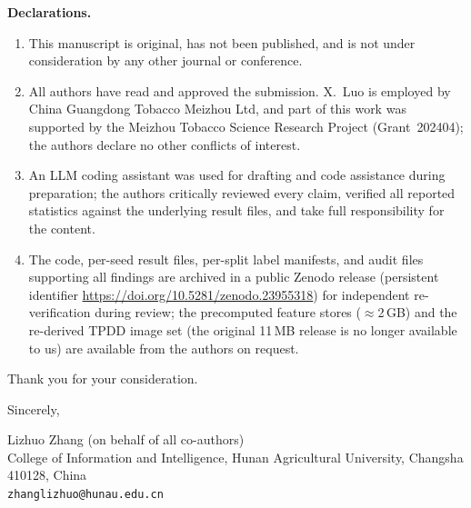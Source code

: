 \documentclass[11pt,a4paper]{article}
\begin{document}
\noindent\textbf{Declarations.}
\begin{enumerate}[leftmargin=2.2em,itemsep=1pt,topsep=2pt]
\item This manuscript is original, has not been published, and is not under consideration by any other journal or conference.
\item All authors have read and approved the submission. X.~Luo is employed by China Guangdong Tobacco Meizhou Ltd, and part of this work was supported by the Meizhou Tobacco Science Research Project (Grant~202404); the authors declare no other conflicts of interest.
\item An LLM coding assistant was used for drafting and code assistance during preparation; the authors critically reviewed every claim, verified all reported statistics against the underlying result files, and take full responsibility for the content.
\item The code, per-seed result files, per-split label manifests, and audit files supporting all findings are archived in a public Zenodo release (persistent identifier \url{https://doi.org/10.5281/zenodo.23955318}) for independent re-verification during review; the precomputed feature stores ($\approx$2\,GB) and the re-derived TPDD image set (the original 11\,MB release is no longer available to us) are available from the authors on request.
\end{enumerate}

Thank you for your consideration.\par
\vspace{0.5em}
Sincerely,\par
\vspace{0.2em}
Lizhuo Zhang (on behalf of all co-authors)\\
College of Information and Intelligence, Hunan Agricultural University, Changsha 410128, China\\
\texttt{zhanglizhuo@hunau.edu.cn}
\end{document}
